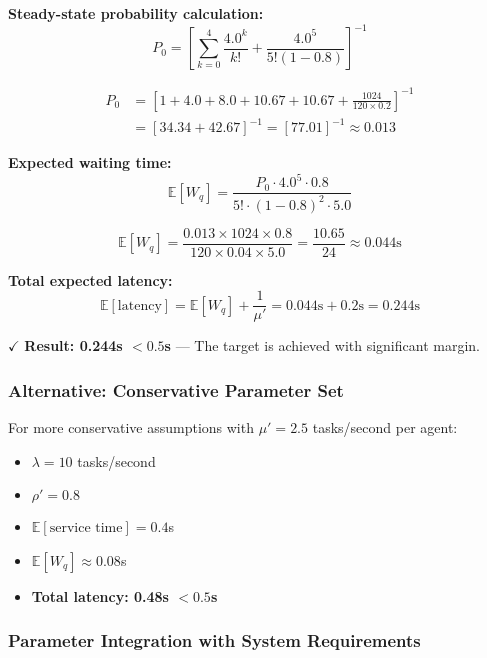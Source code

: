\documentclass{article}
\begin{document}
\textbf{Steady-state probability calculation:}
\begin{equation}
P_0 = \left[\sum_{k=0}^{4} \frac{4.0^k}{k!} + \frac{4.0^5}{5!(1-0.8)}\right]^{-1}
\end{equation}

\begin{align}
P_0 &= \left[1 + 4.0 + 8.0 + 10.67 + 10.67 + \frac{1024}{120 \times 0.2}\right]^{-1}\\
&= \left[34.34 + 42.67\right]^{-1} = [77.01]^{-1} \approx 0.013
\end{align}

\textbf{Expected waiting time:}
\begin{equation}
\mathbb{E}[W_q] = \frac{P_0 \cdot 4.0^5 \cdot 0.8}{5! \cdot (1-0.8)^2 \cdot 5.0}
\end{equation}

\begin{equation}
\mathbb{E}[W_q] = \frac{0.013 \times 1024 \times 0.8}{120 \times 0.04 \times 5.0} = \frac{10.65}{24} \approx 0.044\text{s}
\end{equation}

\textbf{Total expected latency:}
\begin{equation}
\mathbb{E}[\text{latency}] = \mathbb{E}[W_q] + \frac{1}{\mu'} = 0.044\text{s} + 0.2\text{s} = 0.244\text{s}
\end{equation}

$\checkmark$ \textbf{Result: 0.244s $< 0.5$s} --- The target is achieved with significant margin.

\subsubsection{Alternative: Conservative Parameter Set}

For more conservative assumptions with $\mu' = 2.5$ tasks/second per agent:
\begin{itemize}
\item $\lambda = 10$ tasks/second 
\item $\rho' = 0.8$
\item $\mathbb{E}[\text{service time}] = 0.4$s
\item $\mathbb{E}[W_q] \approx 0.08$s
\item \textbf{Total latency: 0.48s $< 0.5$s}
\end{itemize}

\subsubsection{Parameter Integration with System Requirements}
\end{document}
